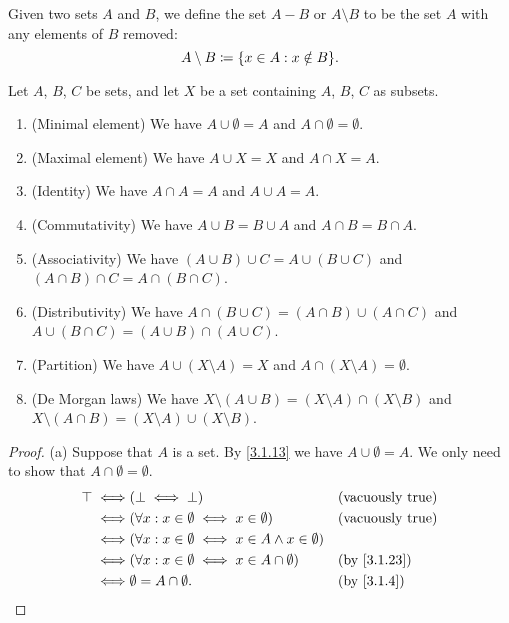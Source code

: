 \setcounter{thm}{26}
\begin{defn}\label{3.1.27}
  Given two sets \(A\) and \(B\), we define the set \(A - B\) or \(A \setminus B\) to be the set \(A\) with any elements of \(B\) removed:
  \[
    A \setminus B \coloneqq \set{x \in A : x \notin B}.
  \]
\end{defn}

\begin{prop}\label{3.1.28}
  Let \(A\), \(B\), \(C\) be sets, and let \(X\) be a set containing \(A\), \(B\), \(C\) as subsets.
  \begin{enumerate}
    \item (Minimal element) We have \(A \cup \emptyset = A\) and \(A \cap \emptyset = \emptyset\).
    \item (Maximal element) We have \(A \cup X = X\) and \(A \cap X = A\).
    \item (Identity) We have \(A \cap A = A\) and \(A \cup A = A\).
    \item (Commutativity) We have \(A \cup B = B \cup A\) and \(A \cap B = B \cap A\).
    \item (Associativity) We have \((A \cup B) \cup C = A \cup (B \cup C)\) and \((A \cap B) \cap C = A \cap (B \cap C)\).
    \item (Distributivity) We have \(A \cap (B \cup C) = (A \cap B) \cup (A \cap C)\) and \(A \cup (B \cap C) = (A \cup B) \cap (A \cup C)\).
    \item (Partition) We have \(A \cup (X \setminus A) = X\) and \(A \cap (X \setminus A) = \emptyset\).
    \item (De Morgan laws) We have \(X \setminus (A \cup B) = (X \setminus A) \cap (X \setminus B)\) and \(X \setminus (A \cap B) = (X \setminus A) \cup (X \setminus B)\).
  \end{enumerate}
\end{prop}

\begin{proof}{(a)}
  Suppose that \(A\) is a set.
  By \cref{3.1.13} we have \(A \cup \emptyset = A\).
  We only need to show that \(A \cap \emptyset = \emptyset\).
  \begin{align*}
    \top \iff & (\bot \iff \bot)                                                 &  & \text{(vacuously true)} \\
    \iff      & (\forall x : x \in \emptyset \iff x \in \emptyset)               &  & \text{(vacuously true)} \\
    \iff      & (\forall x : x \in \emptyset \iff x \in A \land x \in \emptyset)                              \\
    \iff      & (\forall x : x \in \emptyset \iff x \in A \cap \emptyset)        &  & \by{3.1.23}             \\
    \iff      & \emptyset = A \cap \emptyset.                                    &  & \by{3.1.4}
  \end{align*}
\end{proof}

